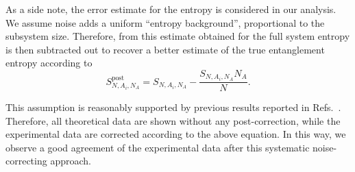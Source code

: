 \documentclass[aps,prl,epsfigure,twocolumn,superscriptaddress]{revtex4-2}
\newcommand{\1}{\mathbbm{1}}
\begin{document}
{	As a side note, the error estimate for the entropy is considered in our analysis. We assume noise adds a uniform ``entropy background'', proportional to the subsystem size. Therefore, from this estimate obtained for the full system entropy is then subtracted out to recover a better estimate of the true entanglement entropy according to~\cite{Hu:25}
	\begin{equation}
		S^{\mathrm{post}}_{N,A_i,N_A} = S_{N,A_i,N_A} - \frac{S_{N,A_i,N_A} N_A}{N} .
	\end{equation}

	This assumption is reasonably supported by previous results reported in Refs.~\cite{Elben:18}. Therefore, all theoretical data are shown without any post-correction, while the experimental data are corrected according to the above equation. In this way, we observe a good agreement of the experimental data after this systematic noise-correcting approach.

}
\end{document}
